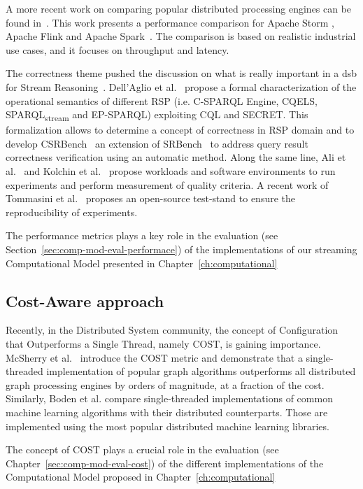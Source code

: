 A more recent work on comparing popular distributed processing engines can be found in~\cite{karimov2018benchmarking}. This work presents a performance comparison for Apache Storm \cite{toshniwal2014storm}, Apache Flink \cite{carbone2015apache} and Apache Spark~\cite{zaharia2016apache}. The comparison is based on realistic industrial use cases, and it focuses on throughput and latency.

The correctness theme pushed the discussion on what is really important in a dsb for Stream Reasoning~\cite{DBLP:conf/esws/ScharrenbachUMVB13}.
Dell'Aglio et al.~\cite{DBLP:conf/semweb/DellAglioCBCV13} propose a formal characterization of the operational semantics of different RSP (i.e. C-SPARQL Engine, CQELS, SPARQL\textsubscript{stream} and EP-SPARQL) exploiting CQL and SECRET. This formalization allows to determine a concept of correctness in RSP domain and to develop CSRBench~\cite{DBLP:conf/semweb/DellAglioCBCV13} an extension of SRBench~\cite{DBLP:conf/semweb/ZhangDCC12} to address query result correctness verification using an automatic method.
Along the same line, Ali et al.~\cite{DBLP:conf/semweb/AliGM15} and Kolchin et al.~\cite{DBLP:conf/icwe/KolchinWKT16} propose workloads and software environments to run experiments and perform measurement of quality criteria.
A recent work of Tommasini et al.~\cite{DBLP:conf/esws/TommasiniVBD16} proposes an open-source test-stand to ensure the reproducibility of experiments.

The performance metrics plays a key role in the evaluation (see Section~\ref{sec:comp-mod-eval-performace}) of the implementations of our streaming Computational Model presented in Chapter~\ref{ch:computational}

\subsection{Cost-Aware approach}\label{sec:bench-cost}
Recently, in the Distributed System community, the concept of Configuration that Outperforms a Single Thread, namely COST, is gaining importance. 
McSherry et al.~\cite{mcsherry2015scalability} introduce the COST metric and demonstrate that a single-threaded implementation of popular graph algorithms outperforms all distributed graph processing engines by orders of magnitude, at a fraction of the cost. Similarly, Boden et al. \cite{bodendistributed} compare single-threaded implementations of common machine learning algorithms with their distributed counterparts. Those are implemented using the most popular distributed machine learning libraries.

The concept of COST plays a crucial role in the evaluation (see Chapter~\ref{sec:comp-mod-eval-cost}) of the different implementations of the Computational Model proposed in Chapter~\ref{ch:computational}




